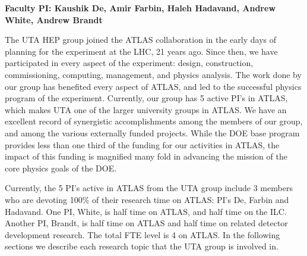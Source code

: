 
\textbf{Faculty PI: Kaushik De, Amir Farbin, Haleh Hadavand, Andrew White, Andrew Brandt}

The UTA HEP group joined the ATLAS collaboration in the early days of planning for the experiment at the LHC, 21 years ago. Since then, we have participated in every aspect of the experiment: design, construction, commissioning, computing, management, and physics analysis. 
The work done by our group has benefited every aspect of ATLAS, and led to the successful physics program of the experiment. 
Currently, our group has 5 active PI's in ATLAS, which makes UTA one of the larger university groups in ATLAS. We have an excellent record of synergistic accomplishments 
among the members of our group, and among the various externally funded projects. While the DOE base program provides less than one third of the funding for our activities in ATLAS, the impact of 
this funding is magnified many fold in advancing the mission of the core physics goals of the DOE.

Currently, the 5 PI's active in ATLAS from the UTA group include 3 members who are devoting 100\% of their research time on ATLAS: PI's De, Farbin and Hadavand. One PI, White, is half time on ATLAS, and half time on the ILC. Another PI, Brandt, is half time on ATLAS and half time on related detector development research. The total FTE level is 4 on ATLAS. In the following sections we describe each research topic that the UTA group is involved in.